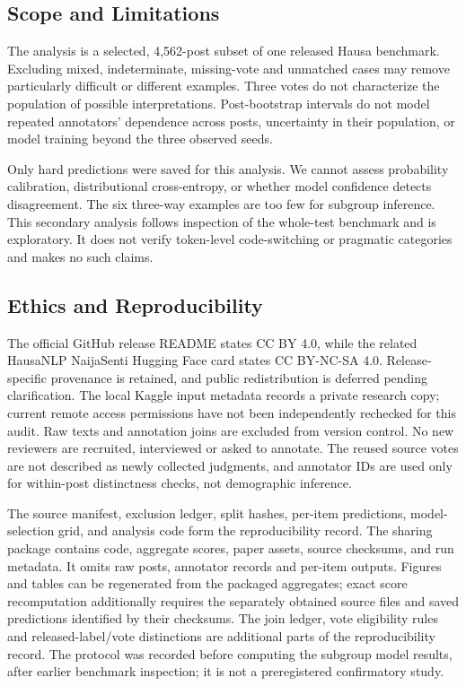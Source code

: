 \documentclass[conference]{IEEEtran}
\begin{document}
\subsection{Scope and Limitations}
The analysis is a selected, 4,562-post subset of one released Hausa benchmark.
Excluding mixed, indeterminate, missing-vote and unmatched cases may remove
particularly difficult or different examples. Three votes do not characterize
the population of possible interpretations. Post-bootstrap intervals do not
model repeated annotators' dependence across posts, uncertainty in their
population, or model training beyond the three observed seeds.

Only hard predictions were saved for this analysis. We cannot assess
probability calibration, distributional cross-entropy, or whether model
confidence detects disagreement. The six three-way examples are too few
for subgroup inference. This secondary analysis follows inspection of the
whole-test benchmark and is exploratory. It does not verify token-level
code-switching or pragmatic categories and makes no such claims.

\subsection{Ethics and Reproducibility}
The official GitHub release README states CC BY 4.0, while the related
HausaNLP NaijaSenti Hugging Face card states CC BY-NC-SA 4.0.
Release-specific provenance is retained, and public redistribution is
deferred pending clarification. The local Kaggle input metadata records a
private research copy; current remote access permissions have not been
independently rechecked for this audit.
Raw texts and annotation joins are excluded from version control. No new
reviewers are recruited, interviewed or asked to annotate. The reused source
votes are not described as newly collected judgments, and annotator IDs are
used only for within-post distinctness checks, not demographic inference.

The source manifest, exclusion ledger, split hashes, per-item predictions,
model-selection grid, and analysis code form the reproducibility record.
The sharing package contains code, aggregate scores, paper assets, source
checksums, and run metadata. It omits raw posts, annotator records and
per-item outputs. Figures and tables can be regenerated from the packaged
aggregates; exact score recomputation additionally requires the separately
obtained source files and saved predictions identified by their checksums.
The join ledger, vote eligibility rules and released-label/vote distinctions
are additional parts of the reproducibility record. The protocol was recorded
before computing the subgroup model results, after earlier benchmark inspection;
it is not a preregistered confirmatory study.
\end{document}
